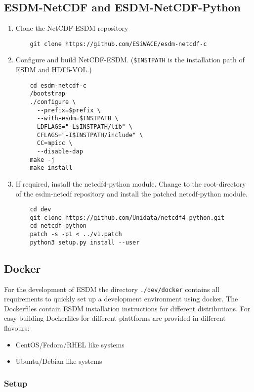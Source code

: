 \subsection{ESDM-NetCDF and ESDM-NetCDF-Python}%
\begin{enumerate}
  \item Clone the NetCDF-ESDM repository
    \begin{lstlisting}
    git clone https://github.com/ESiWACE/esdm-netcdf-c
    \end{lstlisting}
  \item Configure and build NetCDF-ESDM. (\lstinline|$INSTPATH| is the installation path of ESDM and HDF5-VOL.)
    \begin{lstlisting}
    cd esdm-netcdf-c
    /bootstrap
    ./configure \
      --prefix=$prefix \
      --with-esdm=$INSTPATH \
      LDFLAGS="-L$INSTPATH/lib" \
      CFLAGS="-I$INSTPATH/include" \
      CC=mpicc \
      --disable-dap
    make -j
    make install
    \end{lstlisting}
  \item If required, install the netcdf4-python module. 
    Change to the root-directory of the esdm-netcdf repository and install the patched netcdf-python module.
    \begin{lstlisting}
    cd dev
    git clone https://github.com/Unidata/netcdf4-python.git
    cd netcdf-python
    patch -s -p1 < ../v1.patch
    python3 setup.py install --user
    \end{lstlisting}
\end{enumerate}

\subsection{Docker}
For the development of ESDM the directory \lstinline|./dev/docker| contains all requirements to quickly set up a development environment using docker.
The Dockerfiles contain ESDM installation instructions for different distributions.
For easy building Dockerfiles for different plattforms are provided in different flavours:

\begin{itemize}
  \item CentOS/Fedora/RHEL like systems
  \item Ubuntu/Debian like systems
\end{itemize}

\subsubsection{Setup}

